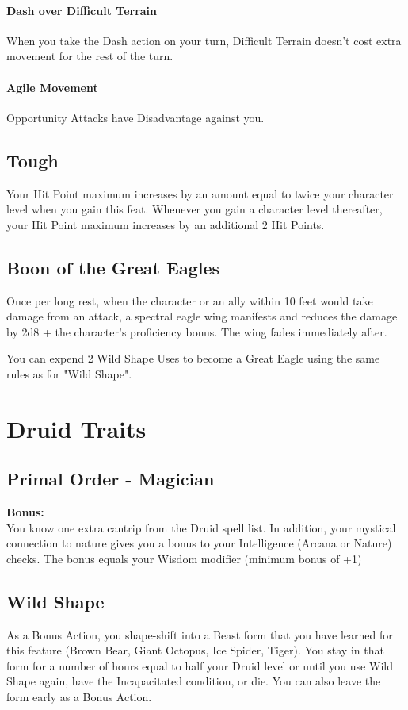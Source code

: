 \documentclass[letterpaper,openany,oneside,twocolumn]{book}
\begin{document}
\paragraph*{Dash over Difficult Terrain} When you take the Dash action on your turn, Difficult Terrain doesn't cost extra movement for the rest of the turn.
\paragraph*{Agile Movement} Opportunity Attacks have Disadvantage against you.
\subsection*{Tough}
Your Hit Point maximum increases by an amount equal to twice your character level when you gain this feat. Whenever you gain a character level thereafter, your Hit Point maximum increases by an additional 2 Hit Points.
\subsection*{Boon of the Great Eagles}
Once per long rest, when the character or an ally within 10 feet would take damage from an attack, a spectral eagle wing manifests and reduces the damage by 2d8 + the character's proficiency bonus. The wing fades immediately after.

You can expend 2 Wild Shape Uses to become a Great Eagle using the same rules as for "Wild Shape".

\section*{Druid Traits}
\subsection*{Primal Order - Magician}
\textbf{Bonus:} \calculateModifier{\WisdomScoreValue}\\
You know one extra cantrip from the Druid spell list. In addition, your mystical connection to nature gives you a bonus to your Intelligence (Arcana or Nature) checks. The bonus equals your Wisdom modifier (minimum bonus of +1)
\subsection*{Wild Shape}
As a Bonus Action, you shape-shift into a Beast form that you have learned for this feature (Brown Bear, Giant Octopus, Ice Spider, Tiger). You stay in that form for a number of hours equal to half your Druid level or until you use Wild Shape again, have the Incapacitated condition, or die. You can also leave the form early as a Bonus Action.
\end{document}
